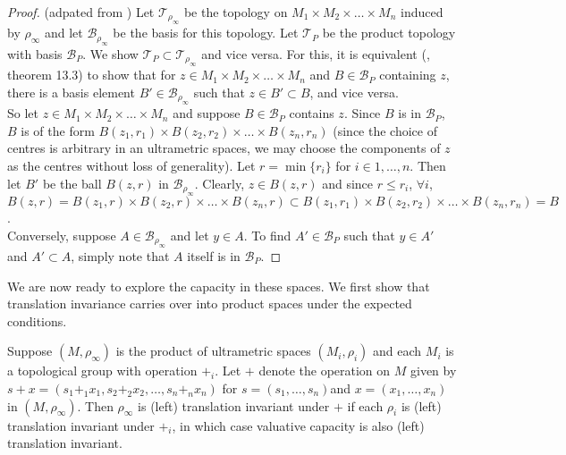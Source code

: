 \begin{proof}
	(adpated from \cite{mun}) Let $\mathcal{T}_{\rho_\infty}$ be the topology on $M_{1} \times M_{2} \times \ldots \times M_{n}$ induced by $\rho_\infty$ and let $\mathcal{B}_{\rho_\infty}$ be the basis for this topology. Let $\mathcal{T}_{P}$ be the product topology with basis $\mathcal{B}_P$. We show $\mathcal{T}_{P} \subset \mathcal{T}_{\rho_\infty}$ and vice versa. For this, it is equivalent (\cite{mun}, theorem 13.3) to show that for $z \in  M_{1} \times M_{2} \times \ldots \times M_{n}$ and $B \in \mathcal{B}_{P}$ containing $z$, there is a basis element $B' \in \mathcal{B}_{\rho_\infty}$ such that $z \in B' \subset B$, and vice versa.\\
	
	So let  $z \in M_{1} \times M_{2} \times \ldots \times M_{n}$ and suppose $B \in \mathcal{B}_{P}$ contains $z$. Since $B$ is in $\mathcal{B}_{P}$, $B$ is of the form $B(z_1,r_1) \times B(z_2,r_2) \times \ldots \times B(z_n,r_n)$ (since the choice of centres is arbitrary in an ultrametric spaces, we may choose the components of $z$ as the centres without loss of generality). Let $r=\min \{r_i\}$ for $i \in 1,\ldots, n$. Then let $B'$ be the ball $B(z,r)$ in $ \mathcal{B}_{\rho_\infty}$. Clearly, $z \in B(z,r)$ and since $r \leq r_i$, $\forall i$, $B(z,r) = B(z_1,r) \times B(z_2,r) \times \ldots \times B(z_n,r) \subset  B(z_1,r_1) \times B(z_2,r_2) \times \ldots \times B(z_n,r_n) =B$.\\
	
	Conversely, suppose $A \in \mathcal{B}_{\rho_\infty}$ and let $y \in A$. To find $A' \in \mathcal{B}_{P}$ such that $y \in A'$ and $A' \subset A$, simply note that $A$ itself is in $\mathcal{B}_{P}$.
	
\end{proof}

We are now ready to explore the capacity in these spaces. We first show that translation invariance carries over into product spaces under the expected conditions.\\ 

\begin{proposition}
Suppose $(M,\rho_\infty)$ is the product of ultrametric spaces $(M_i, \rho_i)$ and each $M_i$ is a topological group with operation $+_i$. Let $+$ denote the operation on $M$ given by $s+x = (s_1 + _1 x_1, s_2 +_2 x_2, \ldots, s_n +_nx_n)$ for $s = (s_1,\ldots,s_n)$and $x =(x_1,\ldots,x_n)$ in $(M, \rho_\infty)$. Then $\rho_\infty$ is (left) translation invariant under $+$ if each $\rho_i$ is (left) translation invariant under $+_i$, in which case valuative capacity is also (left) translation invariant.
\end{proposition}

